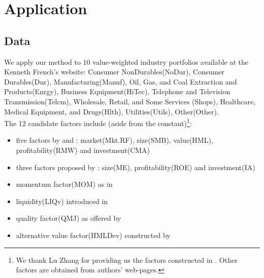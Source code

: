 \documentclass[12pt]{article}
\begin{document}
\section{Application}
\subsection{Data}
We apply our method to 10 value-weighted industry portfolios available at the Kenneth French's website: Consumer NonDurables(NoDur), Consumer Durables(Dur), Manufacturing(Manuf),  Oil, Gas, and Coal Extraction and Products(Enrgy), Business Equipment(HiTec),   Telephone and Television Transmission(Telcm),   Wholesale, Retail, and Some Services (Shops),
Healthcare, Medical Equipment, and Drugs(Hlth),
Utilities(Utils), Other(Other). \\
The 12 candidate factors include (aside from the constant)\footnote{We thank Lu Zhang for providing us the factors constructed in \cite{hou2014digesting}. Other factors are obtained from authors' web-pages.}:
\begin{itemize}
	\item five factors by \cite{fama1993common} and \cite{fama2015five}: market(Mkt.RF), size(SMB), value(HML), profitability(RMW) and investment(CMA)
	\item three factors proposed by \cite{hou2014digesting}: size(ME), profitability(ROE) and investment(IA)
	\item momentum factor(MOM) as in \cite{carhart1997persistence}
	\item liquidity(LIQv) introduced in \cite{stambaugh2003liquidity}
	\item quality factor(QMJ) as offered by \cite{asness2014quality}
	\item alternative value factor(HMLDev) constructed by \cite{asness2013devil}
\end{itemize}
\end{document}
